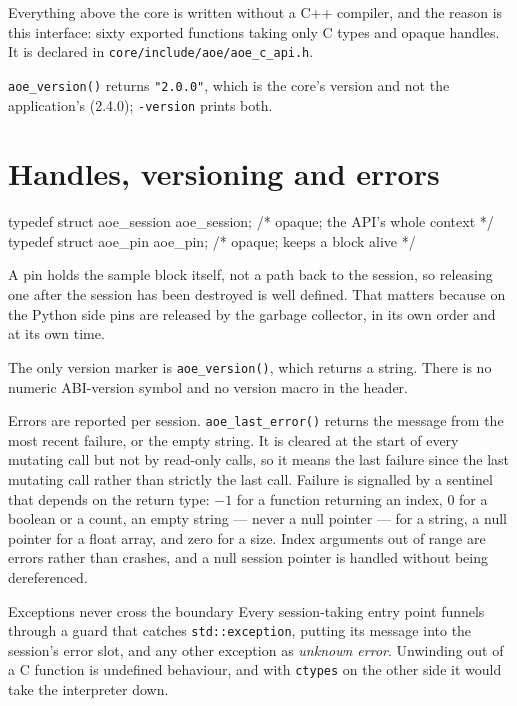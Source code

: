 \documentclass[11pt,a4paper,oneside]{report}
\newcommand{\appver}{2.4.0}
\newcommand{\code}[1]{\texttt{#1}}
\begin{document}
Everything above the core is written without a C++ compiler, and the reason is
this interface: sixty exported functions taking only C types and opaque handles.
It is declared in \code{core/include/aoe/aoe\_c\_api.h}.

\code{aoe\_version()} returns \code{"2.0.0"}, which is the core's version and
not the application's (\appver); \code{-version} prints both.

\section{Handles, versioning and errors}

\begin{aoecode}
typedef struct aoe_session aoe_session;   /* opaque; the API's whole context */
typedef struct aoe_pin     aoe_pin;       /* opaque; keeps a block alive */
\end{aoecode}

A pin holds the sample block itself, not a path back to the session, so
releasing one after the session has been destroyed is well defined. That matters
because on the Python side pins are released by the garbage collector, in its
own order and at its own time.

The only version marker is \code{aoe\_version()}, which returns a string. There
is no numeric ABI-version symbol and no version macro in the header.

Errors are reported per session. \code{aoe\_last\_error()} returns the message
from the most recent failure, or the empty string. It is cleared at the start of
every mutating call but not by read-only calls, so it means the last failure
since the last mutating call rather than strictly the last call. Failure is
signalled by a sentinel that depends on the return type: $-1$ for a function
returning an index, 0 for a boolean or a count, an empty string --- never a null
pointer --- for a string, a null pointer for a float array, and zero for a size.
Index arguments out of range are errors rather than crashes, and a null session
pointer is handled without being dereferenced.

\begin{aoenote}{Exceptions never cross the boundary}
Every session-taking entry point funnels through a guard that catches
\code{std::exception}, putting its message into the session's error slot, and
any other exception as \emph{unknown error}. Unwinding out of a C function is
undefined behaviour, and with \code{ctypes} on the other side it would take the
interpreter down.
\end{aoenote}
\end{document}

